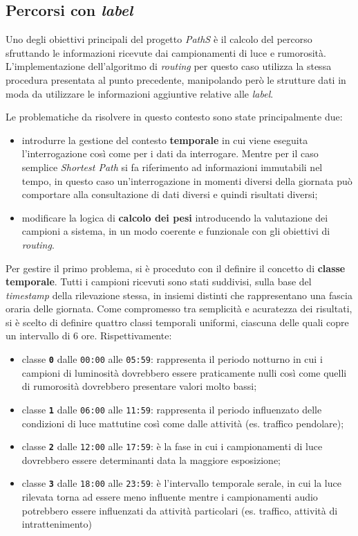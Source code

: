 \subsection{Percorsi con \emph{label}}
Uno degli obiettivi principali del progetto \emph{PathS} è il calcolo del percorso sfruttando le informazioni ricevute dai campionamenti di luce e rumorosità. L'implementazione dell'algoritmo di \emph{routing} per questo caso utilizza la stessa procedura presentata al punto precedente, manipolando però le strutture dati in moda da utilizzare le informazioni aggiuntive relative alle \emph{label}.

Le problematiche da risolvere in questo contesto sono state principalmente due:
\begin{itemize}
\item introdurre la gestione del contesto \textbf{temporale} in cui viene eseguita l'interrogazione così come per i dati da interrogare. Mentre per il caso semplice \emph{Shortest Path} si fa riferimento ad informazioni immutabili nel tempo, in questo caso un'interrogazione in momenti diversi della giornata può comportare alla consultazione di dati diversi e quindi risultati diversi;
\item modificare la logica di \textbf{calcolo dei pesi} introducendo la valutazione dei campioni a sistema, in un modo coerente e funzionale con gli obiettivi di \emph{routing}. 
\end{itemize}
Per gestire il primo problema, si è proceduto con il definire il concetto di \textbf{classe temporale}. Tutti i campioni ricevuti sono stati suddivisi, sulla base del \emph{timestamp} della rilevazione stessa, in insiemi distinti che rappresentano una fascia oraria delle giornata. Come compromesso tra semplicità e acuratezza dei risultati, si è scelto di definire quattro classi temporali uniformi, ciascuna delle quali copre un intervallo di 6 ore. Rispettivamente:
\begin{itemize}
\item classe \texttt{\textbf{0}} dalle \texttt{00:00} alle \texttt{05:59}: rappresenta il periodo notturno in cui i campioni di luminosità dovrebbero essere praticamente nulli così come quelli di rumorosità dovrebbero presentare valori molto bassi;
\item classe \texttt{\textbf{1}} dalle \texttt{06:00} alle \texttt{11:59}: rappresenta il periodo influenzato delle condizioni di luce mattutine così come dalle attività (es. traffico pendolare);
\item classe \texttt{\textbf{2}} dalle \texttt{12:00} alle \texttt{17:59}: è la fase in cui i campionamenti di luce dovrebbero essere determinanti data la maggiore esposizione;
\item classe \texttt{\textbf{3}} dalle \texttt{18:00} alle \texttt{23:59}: è l'intervallo temporale serale, in cui la luce rilevata torna ad essere meno influente mentre i campionamenti audio potrebbero essere influenzati da attività particolari (es. traffico, attività di intrattenimento)
\end{itemize}

